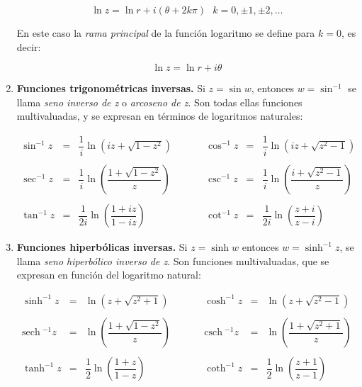 \documentclass[12pt,a4paper]{book}
\newcommand{\parentesis}[1]{\left( #1  \right)}
\newcommand{\sech}{\mathrm{sech} \ }
\newcommand{\csch}{\mathrm{csch} \ }
\begin{document}
\begin{enumerate}
\begin{equation}
\ln z = \ln r + i (\theta + 2k \pi) \ \ \ k = 0, \pm 1, \pm2, \ldots
\end{equation}

En este caso la \textit{rama principal} de la función logaritmo se define para $k=0$, es decir:

\begin{equation}
\ln z = \ln r + i \theta
\end{equation}


\item \textbf{Funciones trigonométricas inversas.} Si $z = \sin w$, entonces $w = \sin^{-1}$ se llama \textit{seno inverso de z} o \textit{arcoseno de z}. Son todas ellas funciones multivaluadas, y se expresan en términos de logaritmos naturales:

\begin{equation}
\begin{array}{cclccclc}

\sin^{-1} z & = & \dfrac{1}{i} \ln (i z + \sqrt{1-z^2}) & \ \ \ \ \ \ \ \ & \cos^{-1} z & = & \dfrac{1}{i} \ln (i z + \sqrt{z^2-1}) \\ \\

\sec^{-1} z & = & \dfrac{1}{i} \ln \parentesis{\dfrac{1 + \sqrt{1-z^2}}{z}} & \ \ & \csc^{-1} z & = & \dfrac{1}{i} \ln  \parentesis{\dfrac{i + \sqrt{z^2-1}}{z}} \\ \\

\tan^{-1} z & = & \dfrac{1}{2i} \ln  \parentesis{\dfrac{1 + i z}{1-iz}} & & \cot^{-1} z & = & \dfrac{1}{2i} \ln  \parentesis{\dfrac{z + i }{z-i}}

\end{array}
\end{equation}

\item \textbf{Funciones hiperbólicas inversas.} Si $z = \sinh w$ entonces $w = \sinh^{-1} z$, se llama \textit{seno hiperbólico inverso de z}. Son funciones multivaluadas, que se expresan en función del logaritmo natural:


\begin{equation}
\begin{array}{cclccclc}

\sinh^{-1} z & = & \ln (z + \sqrt{z^2+1}) & \ \ \ \ \ \ \ \ & \cosh^{-1} z & = & \ln (z + \sqrt{z^2-1}) \\ \\

\sech^{-1} z & = &  \ln \parentesis{\dfrac{1+\sqrt{1-z^2}}{z}} & \ & \csch^{-1} z& = & \ln \parentesis{\dfrac{1+\sqrt{z^2+1}}{z}} \\ \\

\tanh^{-1} z & = & \dfrac{1}{2} \ln  \parentesis{\dfrac{1 + z}{1-z}} & & \coth^{-1} z & = &  \dfrac{1}{2} \ln  \parentesis{\dfrac{z + 1 }{z-1}}

\end{array}
\end{equation}
\end{enumerate}
\end{document}
